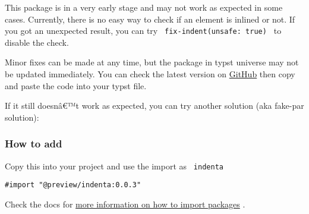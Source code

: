 \begin{Shaded}
\begin{Highlighting}[]
\NormalTok{\#block[\#set text(fill: red)}



\NormalTok{]}
\end{Highlighting}
\end{Shaded}

This package is in a very early stage and may not work as expected in
some cases. Currently, there is no easy way to check if an element is
inlined or not. If you got an unexpected result, you can try
\texttt{\ fix-indent(unsafe:\ true)\ } to disable the check.

Minor fixes can be made at any time, but the package in typst universe
may not be updated immediately. You can check the latest version on
\href{https://github.com/flaribbit/indenta}{GitHub} then copy and paste
the code into your typst file.

If it still doesnâ€™t work as expected, you can try another solution
(aka fake-par solution):

\begin{Shaded}
\begin{Highlighting}[]
\end{Highlighting}
\end{Shaded}

\subsubsection{How to add}\label{how-to-add}

Copy this into your project and use the import as \texttt{\ indenta\ }

\begin{verbatim}
#import "@preview/indenta:0.0.3"
\end{verbatim}



Check the docs for
\href{https://typst.app/docs/reference/scripting/\#packages}{more
information on how to import packages} .

